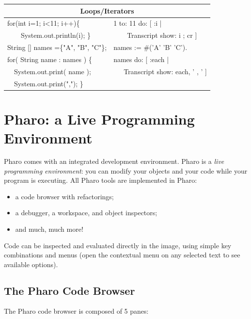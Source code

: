 \documentclass[notumble]{leaflet}
\begin{document}
\noindent
\begin{tabularx}{\linewidth}{@{}lX@{}}
        \toprule
        \multicolumn{2}{c}{\textbf{Loops/Iterators}}\\
        \midrule
         for(int i=1; i<11; i++)\{ & 1 to: 11 do: [ :i | \\
      \ \ \ \    System.out.println(i); \}&\ \ \ \ Transcript show: i ; cr ] \\
      \midrule
String [] names =\{"A", "B", "C"\};& names := \#('A' 'B' 'C'). \\  
for( String name : names ) \{ &names do: [ :each |\\
   \ \      System.out.print( name ); & \ \ \ Transcript show: each, ' , ' ]\\
    \ \     System.out.print(","); \} & \\
     \midrule
\end{tabularx}


\section{Pharo: a Live Programming Environment}

Pharo comes with an integrated development environment. Pharo
is a \emph{live programming environment}: you can modify your objects
and your code while your program is executing. All Pharo tools are
implemented in Pharo:
\begin{itemize}
\item a code browser with refactorings;
\item a debugger, a workspace, and object inspectors;
\item and much, much more!
\end{itemize}

Code can be inspected and evaluated directly in the image, using
simple key combinations and menus (open the contextual menu on any
selected text to see available options).


\subsection{The Pharo Code Browser}

The Pharo code browser is composed of 5 panes:
\end{document}
